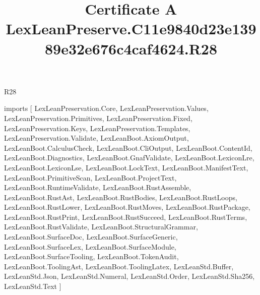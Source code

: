 \begin{lexlean}{R28}
\title{Certificate A LexLeanPreserve.C11e9840d23e13989e32e676c4caf4624.R28}
\begin{coremodule}
imports [
  LexLeanPreservation.Core,
  LexLeanPreservation.Values,
  LexLeanPreservation.Primitives,
  LexLeanPreservation.Fixed,
  LexLeanPreservation.Keys,
  LexLeanPreservation.Templates,
  LexLeanPreservation.Validate,
  LexLeanBoot.AxiomOutput,
  LexLeanBoot.CalculusCheck,
  LexLeanBoot.CliOutput,
  LexLeanBoot.ContentId,
  LexLeanBoot.Diagnostics,
  LexLeanBoot.GnafValidate,
  LexLeanBoot.LexiconLre,
  LexLeanBoot.LexiconLse,
  LexLeanBoot.LockText,
  LexLeanBoot.ManifestText,
  LexLeanBoot.PrimitiveScan,
  LexLeanBoot.ProjectText,
  LexLeanBoot.RuntimeValidate,
  LexLeanBoot.RustAssemble,
  LexLeanBoot.RustAst,
  LexLeanBoot.RustBodies,
  LexLeanBoot.RustLoops,
  LexLeanBoot.RustLower,
  LexLeanBoot.RustMoves,
  LexLeanBoot.RustPackage,
  LexLeanBoot.RustPrint,
  LexLeanBoot.RustSucceed,
  LexLeanBoot.RustTerms,
  LexLeanBoot.RustValidate,
  LexLeanBoot.StructuralGrammar,
  LexLeanBoot.SurfaceDoc,
  LexLeanBoot.SurfaceGeneric,
  LexLeanBoot.SurfaceLex,
  LexLeanBoot.SurfaceModule,
  LexLeanBoot.SurfaceTooling,
  LexLeanBoot.TokenAudit,
  LexLeanBoot.ToolingAst,
  LexLeanBoot.ToolingLatex,
  LexLeanStd.Buffer,
  LexLeanStd.Json,
  LexLeanStd.Numeral,
  LexLeanStd.Order,
  LexLeanStd.Sha256,
  LexLeanStd.Text
]


\end{coremodule}
\end{lexlean}

